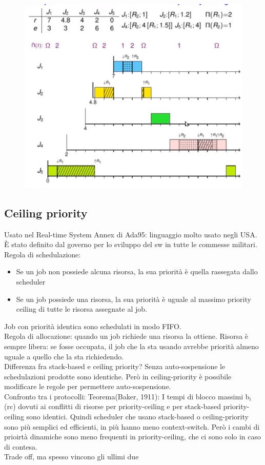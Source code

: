 \documentclass[12pt, oneside]{extbook}
\begin{document}
\begin{figure}[!h]
\centering
\includegraphics[scale=0.4]{immagini/image-032.jpg}
\end{figure}
\subsection{Ceiling priority}
Usato nel Real-time System Annex di Ada95: linguaggio molto usato negli USA. È stato definito dal governo per lo sviluppo del sw in tutte le commesse militari.\\ Regola di schedulazione:
\begin{itemize}
\item Se un job non possiede alcuna risorsa, la sua priorità è quella rassegata dallo scheduler
\item Se un job possiede una risorsa, la sua priorità è uguale al massimo priority ceiling di tutte le risorsa assegnate al job.
\end{itemize}
Job con priorità identica sono schedulati in modo FIFO.\\ Regola di allocazione: quando un job richiede una risorsa la ottiene. Risorsa è sempre libera: se fosse occupata, il job che la sta usando avrebbe priorità almeno uguale a quello che la sta richiedendo.\\ Differenza fra stack-based e ceiling priority? Senza auto-sospensione le schedulazioni prodotte sono identiche. Però in ceiling-priority è possibile modificare le regole per permettere auto-sospensione.\\ Confronto tra i protocolli: Teorema(Baker, 1911): I tempi di blocco massimi b$_{i}$(rc) dovuti ai conflitti di risorse per priority-ceiling e per stack-based priority-ceiling sono identici. Quindi scheduler che usano stack-based o ceiling-priority sono più semplici ed efficienti, in più hanno meno context-switch. Però i cambi di prioirtà dinamiche sono meno frequenti in priority-ceiling, che ci sono solo in caso di contesa.\\ Trade off, ma spesso vincono gli ullimi due
\end{document}
